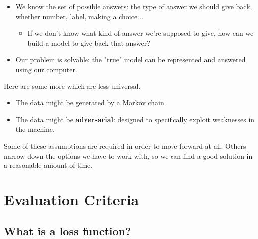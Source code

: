            \begin{itemize}
                \item We know the set of possible answers: the type of answer we should give back, whether number, label, making a choice...
                    \begin{itemize}
                        \item If we don't know what kind of answer we're supposed to give, how can we build a model to give back that answer? 
                    \end{itemize}
                    
                \item Our problem is solvable: the "true" model can be represented and answered using our computer.
                        
            \end{itemize}
            
        Here are some more which are less universal.
        
        \begin{itemize}
            \item The data might be generated by a Markov chain. 
            
            \item The data might be \textbf{adversarial}: designed to specifically exploit weaknesses in the machine.
        \end{itemize}
            
        Some of these assumptions are required in order to move forward at all. Others narrow down the options we have to work with, so we can find a good solution in a reasonable amount of time.
        
\pagebreak

\section{Evaluation Criteria}
    
    \subsection{What is a loss function?}
    
